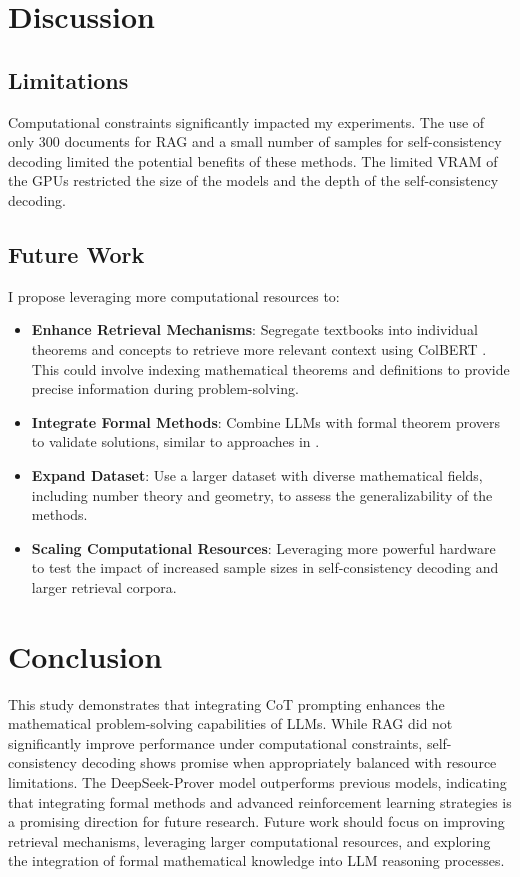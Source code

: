 \documentclass[11pt,a4paper]{article}
\begin{document}
\section{Discussion}
\subsection{Limitations}
Computational constraints significantly impacted my experiments. The use of only 300 documents for RAG and a small number of samples for self-consistency decoding limited the potential benefits of these methods. The limited VRAM of the GPUs restricted the size of the models and the depth of the self-consistency decoding.

\subsection{Future Work}
I propose leveraging more computational resources to:

\begin{itemize}[noitemsep,nolistsep]
    \item \textbf{Enhance Retrieval Mechanisms}: Segregate textbooks into individual theorems and concepts to retrieve more relevant context using ColBERT \cite{khattab2020colbert}. This could involve indexing mathematical theorems and definitions to provide precise information during problem-solving.
    \item \textbf{Integrate Formal Methods}: Combine LLMs with formal theorem provers to validate solutions, similar to approaches in \cite{gou2024toratoolintegratedreasoningagent}.
    \item \textbf{Expand Dataset}: Use a larger dataset with diverse mathematical fields, including number theory and geometry, to assess the generalizability of the methods.
    \item \textbf{Scaling Computational Resources}: Leveraging more powerful hardware to test the impact of increased sample sizes in self-consistency decoding and larger retrieval corpora.
\end{itemize}

\section{Conclusion}
This study demonstrates that integrating CoT prompting enhances the mathematical problem-solving capabilities of LLMs. While RAG did not significantly improve performance under computational constraints, self-consistency decoding shows promise when appropriately balanced with resource limitations. The DeepSeek-Prover model outperforms previous models, indicating that integrating formal methods and advanced reinforcement learning strategies is a promising direction for future research. Future work should focus on improving retrieval mechanisms, leveraging larger computational resources, and exploring the integration of formal mathematical knowledge into LLM reasoning processes.
\end{document}
